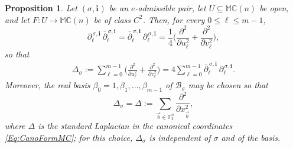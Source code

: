\documentclass[12pt]{amsart}
\theoremstyle{plain}
\newtheorem{proposition}[theorem]{Proposition}
\theoremstyle{definition}
\numberwithin{equation}{section}
\newcommand{\im}[1]{\mathbf{ i_{#1}}}
\newcommand{\mC}{\mathbb{C}}
\newcommand{\mM}{\mathbb{M}}
\newcommand{\cB}{\mathcal{B}}
\newcommand{\ra}{\rightarrow}
\begin{document}
    \begin{proposition}\label{P:EllipticFactorization}
    Let $(\sigma , \im{})$ be an $e$-admissible pair, let $U \subseteq \mM \mC(n)$ be open, and let $F : U \ra \mM \mC(n)$ be of class $C^2$. Then, for every $0 \leq \ell \leq m - 1$,
        \begin{equation}\label{Eq:BlockFactorization}
        \partial_\ell^{\, \sigma , \im{}}\, \overline{\partial}_\ell^{\, \sigma , \im{}} = \overline{\partial}_\ell^{\, \sigma , \im{}}\, \partial_\ell^{\, \sigma , \im{}} = \frac{1}{4} \Big( \frac{\partial^2}{\partial u_\ell^2} + \frac{\partial^2}{\partial v_\ell^2} \Big) ,
        \end{equation}
    so that
        \begin{align*}
        \Delta_\sigma := \sum_{\ell = 0}^{m - 1} \Big( \frac{\partial^2}{\partial u_\ell^2} + \frac{\partial^2}{\partial v_\ell^2} \Big) = 4 \sum_{\ell = 0}^{m - 1} \overline{\partial}_\ell^{\, \sigma , \im{}}\, \partial_\ell^{\, \sigma , \im{}} .
        \end{align*}
    Moreover, the real basis $\beta_0 = 1 , \beta_1 , \ldots , \beta_{m - 1}$ of $\cB_\sigma$ may be chosen so that
        \begin{equation}\label{Eq:CanonicalLaplacian}
        \Delta_\sigma = \Delta := \sum_{\vec b \in \mathbb F_2^n} \frac{\partial^2}{\partial x_{\vec b}^2} ,
        \end{equation}
    where $\Delta$ is the standard Laplacian in the canonical coordinates \eqref{Eq:CanoFormMC}; for this choice, $\Delta_\sigma$ is independent of $\sigma$ and of the basis. %
    \end{proposition}
\end{document}
